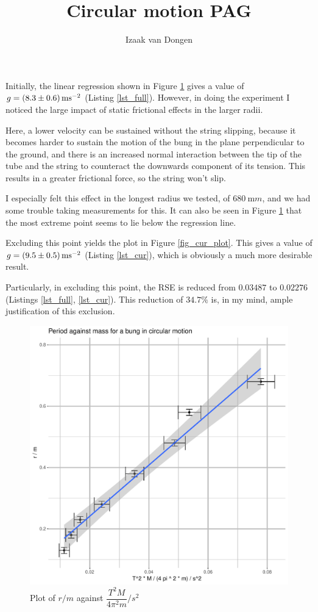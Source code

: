 \documentclass[a4paper,11pt]{article}
\title{Circular motion PAG}
\author{Izaak van Dongen}
\begin{document}
    \maketitle%

Initially, the linear regression shown in Figure \ref{fig_full_plot} gives a
value of \(g = \SI{8.3 \pm 0.6}{ms^{-2}}\) (Listing \ref{lst_full}). However, in
doing the experiment I noticed the large impact of static frictional effects in
the larger radii.

Here, a lower velocity can be sustained without the string slipping, because it
becomes harder to sustain the motion of the bung in the plane perpendicular to
the ground, and there is an increased normal interaction between the tip of the
tube and the string to counteract the downwards component of its tension. This
results in a greater frictional force, so the string won't slip.

I especially felt this effect in the longest radius we tested, of
\(\SI{680}{\milli m}\), and we had some trouble taking measurements for this.
It can also be seen in Figure \ref{fig_full_plot} that the most extreme point
seems to lie below the regression line.

Excluding this point yields the plot in Figure \ref{fig_cur_plot}. This gives a
value of \(g = \SI{9.5 \pm 0.5}{ms^{-2}}\) (Listing \ref{lst_cur}), which is
obviously a much more desirable result.

Particularly, in excluding this point, the RSE is reduced from \(0.03487\) to
\(0.02276\) (Listings \ref{lst_full}, \ref{lst_cur}). This reduction of
\(34.7 \%\) is, in my mind, ample justification of this exclusion.

\begin{figure}[h]
\includegraphics[width=\textwidth]{full_plot.pdf}
\caption{Plot of \(r/\si{m}\) against \(\dfrac{T^2 M}{4\pi^2m}/\si{s^2}\)}
\label{fig_full_plot}
\end{figure}
\end{document}
